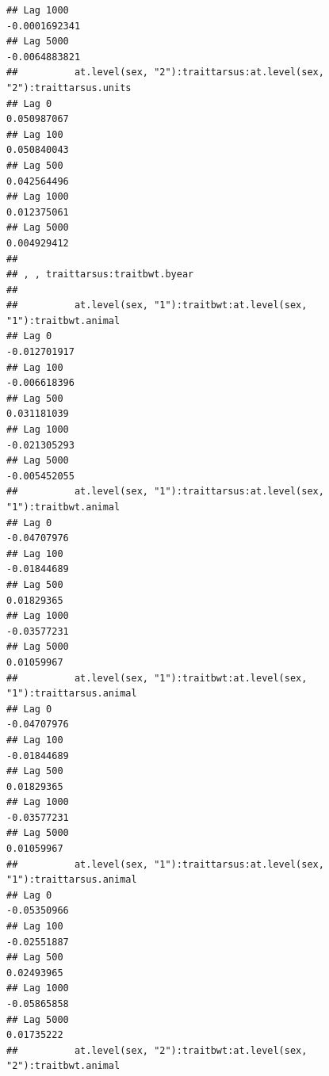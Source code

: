 \documentclass[
  12pt,
]{book}
\begin{document}
\begin{verbatim}
## Lag 1000                                                    -0.0001692341
## Lag 5000                                                    -0.0064883821
##          at.level(sex, "2"):traittarsus:at.level(sex, "2"):traittarsus.units
## Lag 0                                                            0.050987067
## Lag 100                                                          0.050840043
## Lag 500                                                          0.042564496
## Lag 1000                                                         0.012375061
## Lag 5000                                                         0.004929412
## 
## , , traittarsus:traitbwt.byear
## 
##          at.level(sex, "1"):traitbwt:at.level(sex, "1"):traitbwt.animal
## Lag 0                                                      -0.012701917
## Lag 100                                                    -0.006618396
## Lag 500                                                     0.031181039
## Lag 1000                                                   -0.021305293
## Lag 5000                                                   -0.005452055
##          at.level(sex, "1"):traittarsus:at.level(sex, "1"):traitbwt.animal
## Lag 0                                                          -0.04707976
## Lag 100                                                        -0.01844689
## Lag 500                                                         0.01829365
## Lag 1000                                                       -0.03577231
## Lag 5000                                                        0.01059967
##          at.level(sex, "1"):traitbwt:at.level(sex, "1"):traittarsus.animal
## Lag 0                                                          -0.04707976
## Lag 100                                                        -0.01844689
## Lag 500                                                         0.01829365
## Lag 1000                                                       -0.03577231
## Lag 5000                                                        0.01059967
##          at.level(sex, "1"):traittarsus:at.level(sex, "1"):traittarsus.animal
## Lag 0                                                             -0.05350966
## Lag 100                                                           -0.02551887
## Lag 500                                                            0.02493965
## Lag 1000                                                          -0.05865858
## Lag 5000                                                           0.01735222
##          at.level(sex, "2"):traitbwt:at.level(sex, "2"):traitbwt.animal

\end{verbatim}
\end{document}
